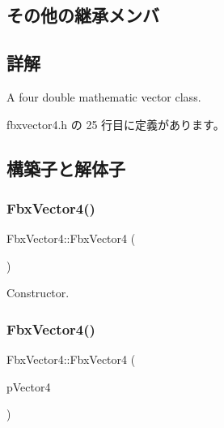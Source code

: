 \subsection*{その他の継承メンバ}


\subsection{詳解}
A four double mathematic vector class. 

 fbxvector4.\+h の 25 行目に定義があります。



\subsection{構築子と解体子}
\mbox{\label{class_fbx_vector4_af346570e3050b36bf11a1cf3d162ed4e}} 
\subsubsection{\texorpdfstring{Fbx\+Vector4()}{FbxVector4()}\hspace{0.1cm}{\footnotesize\ttfamily [1/5]}}
{\footnotesize\ttfamily Fbx\+Vector4\+::\+Fbx\+Vector4 (\begin{DoxyParamCaption}{ }\end{DoxyParamCaption})}



Constructor. 

\mbox{\label{class_fbx_vector4_a87adf6b4cc9e6aa4b81e5067dd3d6102}} 
\subsubsection{\texorpdfstring{Fbx\+Vector4()}{FbxVector4()}\hspace{0.1cm}{\footnotesize\ttfamily [2/5]}}
{\footnotesize\ttfamily Fbx\+Vector4\+::\+Fbx\+Vector4 (\begin{DoxyParamCaption}\item[{const \hyperlink{class_fbx_vector4}{Fbx\+Vector4} \&}]{p\+Vector4 }\end{DoxyParamCaption})}

